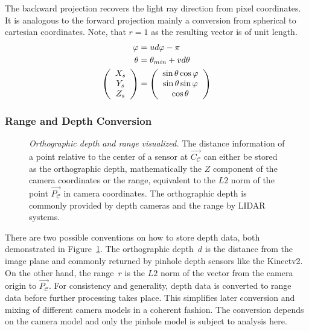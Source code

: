 The backward projection recovers the light ray direction from pixel coordinates.
It is analogous to the forward projection mainly a conversion from spherical to cartesian coordinates.
Note, that $r = 1$ as the resulting vector is of unit length.
\begin{equation}
\begin{aligned}
    \varphi &= u d\varphi - \pi \\
    \theta &= \theta_{min} + v d\theta \\
    \left(\begin{array}{c} X_s \\ Y_s \\ Z_s \end{array}\right) &= \left(\begin{array}{c} \sin \theta \cos \varphi \\ \sin \theta \sin \varphi \\ \cos \theta \end{array}\right)
\end{aligned}
\end{equation}

\subsubsection{Range and Depth Conversion}\label{sec:range_depth_conversion}

\begin{figure}[H]
    \scalebox{0.8}{%
    
    }
    \caption[Orthographic depth and range visualized]{\emph{Orthographic depth and range visualized.} The distance information of a point relative to the center of a sensor at $\vec{C_\mathcal{C}}$ can either be stored as the orthographic depth, mathematically the $Z$ component of the camera coordinates or the range, equivalent to the $L2$ norm of the point $\vec{P_\mathcal{C}}$ in camera coordinates. The orthographic depth is commonly provided by depth cameras and the range by \acrshort{LIDAR} systems.}
    \label{fig:range_depth}
\end{figure}

There are two possible conventions on how to store depth data, both demonstrated in Figure~\ref{fig:range_depth}.
The orthographic depth~$d$ is the distance from the image plane and commonly returned by pinhole depth sensors like the Kinectv2.
On the other hand, the range~$r$ is the $L2$ norm of the vector from the camera origin to $\vec{P_\mathcal{C}}$.
For consistency and generality, depth data is converted to range data before further processing takes place.
This simplifies later conversion and mixing of different camera models in a coherent fashion.
The conversion depends on the camera model and only the pinhole model is subject to analysis here.

